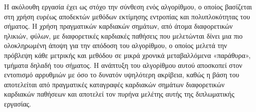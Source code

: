 \par
Η ακόλουθη εργασία έχει ως στόχο την σύνθεση ενός αλγορίθμου, ο οποίος βασίζεται στη χρήση ευρέως αποδεκτών μεθόδων εκτίμησης εντροπίας και πολυπλοκότητας του σήματος. Η χρήση πραγματικών καρδιακών σημάτων, από άτομα διαφορετικών ηλικιών, φύλων, με διαφορετικές καρδιακές παθήσεις που μελετώνται δίνει μια πιο ολοκληρωμένη άποψη για την απόδοση του αλγορίθμου, ο οποίος μελετά την πρόβλεψη κάθε μετρικής και μεθόδου σε μικρά χρονικά μεταβαλλόμενα «παράθυρα», τμήματα δηλαδή του σήματος. Η ανάπτυξη του αλγορίθμου αυτού αποσκοπεί στον εντοπισμό αρρυθμιών με όσο το δυνατόν υψηλότερη ακρίβεια, καθώς η βάση του αποτελείται από πραγματικές καταγραφές καρδιακών σημάτων διαφορετικών καρδιακών παθήσεων και αποτελεί τον πυρήνα μελέτης αυτής της διπλωματικής εργασίας.
